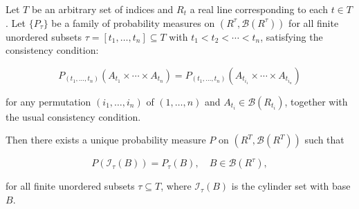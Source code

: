 Let $T$ be an arbitrary set of indices and $R_t$ a real line corresponding to each $t \in T$. Let $\{P_\tau\}$ be a family of probability measures on $(R^\tau, \mathcal{B}(R^\tau))$ for all finite unordered subsets $\tau = [t_1, \ldots, t_n] \subseteq T$ with $t_1 < t_2 < \cdots < t_n$, satisfying the consistency condition:

$$P_{(t_1, \ldots, t_n)}(A_{t_1} \times \cdots \times A_{t_n}) = P_{(t_1, \ldots, t_n)}(A_{t_{i_1}} \times \cdots \times A_{t_{i_n}})$$

for any permutation $(i_1, \ldots, i_n)$ of $(1, \ldots, n)$ and $A_{t_i} \in \mathcal{B}(R_{t_i})$, together with the usual consistency condition.

Then there exists a unique probability measure $P$ on $(R^T, \mathcal{B}(R^T))$ such that

$$P(\mathcal{I}_\tau(B)) = P_\tau(B), \quad B \in \mathcal{B}(R^\tau),$$

for all finite unordered subsets $\tau \subseteq T$, where $\mathcal{I}_\tau(B)$ is the cylinder set with base $B$.
